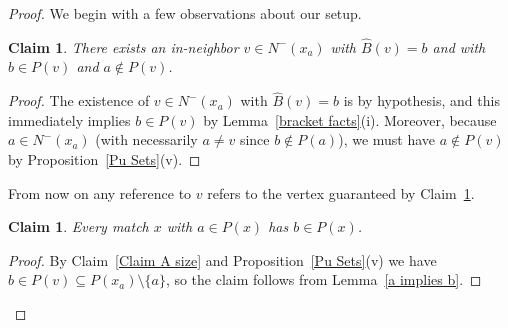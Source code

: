 \documentclass[12pt,letterpaper]{article}
\newtheorem{claim}[thm]{Claim}
\theoremstyle{definition}
\renewcommand{\1}{\mathbbm{1}}
\newcommand{\sm}{\setminus}
\newcommand{\sub}{\subseteq}
\begin{document}
\begin{proof}
	We begin with a few observations about our setup.
	\begin{claim}\label{Claim favorite team nice vertex}
		There exists an in-neighbor $v\in N^-(x_a)$ with $\widehat{B}(v)=b$ and with $b\in P(v)$ and $a\notin P(v)$.
	\end{claim}
	\begin{proof}
		The existence of $v\in N^-(x_a)$ with $\widehat{B}(v)=b$ is by hypothesis, and this immediately implies $b\in P(v)$ by Lemma~\ref{bracket facts}(i).  Moreover, because $a\in N^-(x_a)$ (with necessarily $a\ne v$ since $b\notin P(a)$), we must have $a\notin P(v)$ by Proposition~\ref{Pu Sets}(v).
	\end{proof}
	From now on any reference to $v$ refers to the vertex guaranteed by Claim~\ref{Claim favorite team nice vertex}.
	
	\begin{claim}\label{Claim favorite team a implies b}
		Every match $x$ with $a\in P(x)$ has $b\in P(x)$.
	\end{claim}
	\begin{proof}
		By Claim~\ref{Claim A size} and Proposition~\ref{Pu Sets}(v) we have $b\in P(v)\sub P(x_a)\sm \{a\}$, so the claim follows from Lemma~\ref{a implies b}.
		
		
	\end{proof}
	

\end{proof}
\end{document}
